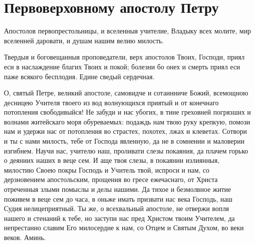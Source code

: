 \section{Первоверховному апостолу Петру}\begin{mymulticols}


Апостолов первопрестольницы, и вселенныя учителие, Владыку всех молите, мир вселенней даровати, и душам нашим велию милость.


Твердыя и боговещанныя проповедатели, верх апостолов Твоих, Господи, приял еси в наслаждение благих Твоих и покой; болезни бо онех и смерть приял еси паже всякого бесплодия. Едине сведый сердечная.


О, святый Петре, великий апостоле, самовидче и сотаинниче Божий, всемощною десницею Учителя твоего из вод волнующихся приятый и от конечнаго потопления свободивыйся! Не забуди и нас убогих, в тине греховней погрязших и волнами житейскаго моря обуреваемых: подаждь нам твою руку крепкую, помози нам и удержи нас от потопления во страстех, похотех, лжах и клеветах. Сотвори и ты с нами милость, тебе от Господа явленную, да не в сомнении и маловерии изгибнем. Научи нас, учителю наш, проливати слезы покаяния, да плачем горько о деяниих наших в веце сем. И аще твоя слезы, в покаянии излиянныя, милостию Своею покры Господь и Учитель твой, испроси и нам, со дерзновением апостольским, прощения во гресе ежечаснаго, от Христа отреченныя злыми помыслы и делы нашими. Да тихое и безмолвное житие поживем в веце сем до часа, в оньже имать призвати нас века Господь, наш Судия нелицеприятный. Ты же, о всехвальный апостоле, не отвержи вопля нашего и стенаний к тебе, но заступи нас пред Христом твоим Учителем, да непрестанно славим Его милосердие к нам, со Отцем и Святым Духом, во веки веков. Аминь.

\end{mymulticols}

\mychapterending



